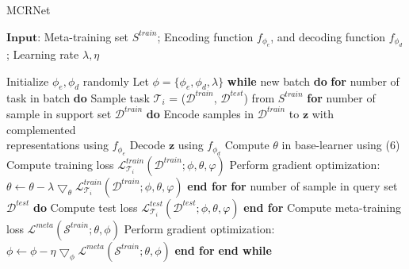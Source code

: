 \documentclass[10pt,conference,a4paper]{IEEEtran}
\begin{document}
\begin{algorithm}
	\caption{MCRNet }
	\label{alg:A}
	$\textbf{Input}$: Meta-training set $S^{train}$; Encoding function $f_{\phi_{e}}$, and decoding function $f_{\phi_{d}}$; Learning rate $\lambda, \eta$ 
	\begin{algorithmic}[1]
		\STATE Initialize $\phi_{e}, \phi_{d}$ randomly
		\STATE Let $\phi = \{\phi_{e}, \phi_{d}, \lambda\}$
		\STATE \textbf{while} new batch \textbf{do}
		\STATE \hspace{2ex}\textbf{for} number of task in batch \textbf{do}
		\STATE \hspace{4ex}Sample task $\mathcal{T}_{i}$ = ($\mathcal{D}^{train}$, $\mathcal{D}^{test}$) from $S^{train}$
		\STATE \hspace{4ex}\textbf{for} number of sample in support set $\mathcal{D}^{train}$ \textbf{do}
\STATE \hspace{6ex}Encode samples in $\mathcal{D}^{train}$ to $\mathbf{z}$ with complemented\\
		\hspace{6ex}representations using $f_{\phi_{e}}$
		\STATE \hspace{6ex}Decode $\mathbf{z}$ using $f_{\phi_{d}}$ 
		\STATE \hspace{6ex}Compute $\theta$ in base-learner using (6)
		\STATE \hspace{6ex}Compute training loss $\mathcal{L}_{\mathcal{T}_{i}}^{train}(\mathcal{D}^{train}; \phi, \theta, \varphi)$
		\STATE \hspace{6ex}Perform gradient optimization:\\
		\hspace{6ex}$\theta \gets \theta - \lambda\bigtriangledown_{\theta}\mathcal{L}_{\mathcal{T}_{i}}^{train}(\mathcal{D}^{train}; \phi, \theta, \varphi)$
		\STATE \hspace{4ex}\textbf{end for}
		\STATE \hspace{4ex}\textbf{for} number of sample in query set $\mathcal{D}^{test}$ \textbf{do}
		\STATE \hspace{6ex}Compute test loss $\mathcal{L}_{\mathcal{T}_{i}}^{test}(\mathcal{D}^{test}; \phi, \theta, \varphi)$
		\STATE \hspace{4ex}\textbf{end for}
		\STATE \hspace{4ex}Compute meta-training loss $\mathcal{L}^{meta}(\mathcal{S}^{train}; \theta, \phi)$
		\STATE \hspace{4ex}Perform gradient optimization:\\
		\hspace{4ex}$\phi \gets \phi - \eta\bigtriangledown_{\phi}\mathcal{L}^{meta}(\mathcal{S}^{train}; \theta, \phi)$
		\STATE \hspace{2ex}\textbf{end for}
		\STATE \textbf{end while}
	\end{algorithmic}
\end{algorithm}
\end{document}

